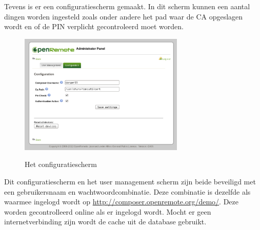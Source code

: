 \documentclass[]{article}
\begin{document}
Tevens is er een configuratiescherm gemaakt. In dit scherm kunnen een aantal dingen worden
ingesteld zoals onder andere het pad waar de CA opgeslagen wordt en of de PIN
verplicht gecontroleerd moet worden.

\begin{figure}[h!]
  \centering
    \includegraphics[width=0.7\textwidth,keepaspectratio]{adminv2config.pdf}
  \label{adminv2config}
  \caption{Het configuratiescherm}
\end{figure}

Dit configuratiescherm en het user management scherm zijn beide beveiligd met
een gebruikersnaam en wachtwoordcombinatie. Deze combinatie is dezelfde als
waarmee ingelogd wordt op \url{http://composer.openremote.org/demo/}. 
Deze worden gecontrolleerd online als er ingelogd wordt. Mocht er geen
internetverbinding zijn wordt de cache uit de database gebruikt.
\end{document}
